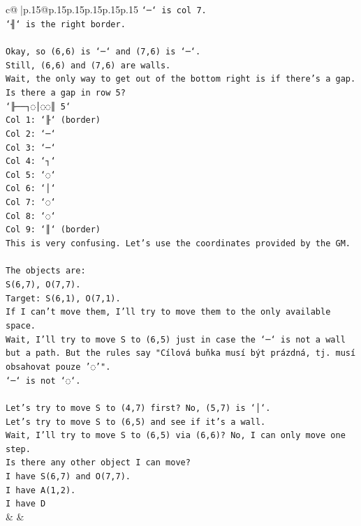 \documentclass{article}
\begin{document}
{\begin{supertabular}{c@{$\;$}|p{.15\linewidth}@{}p{.15\linewidth}p{.15\linewidth}p{.15\linewidth}p{.15\linewidth}p{.15\linewidth}}
{{{\texttt{`─` is col 7.} \\
\texttt{`╢` is the right border.} \\
\\ 
\texttt{Okay, so (6,6) is `─` and (7,6) is `─`.} \\
\texttt{Still, (6,6) and (7,6) are walls.} \\
\texttt{Wait, the only way to get out of the bottom right is if there's a gap.} \\
\texttt{Is there a gap in row 5?} \\
\texttt{`╟──┐◌│◌◌║ 5`} \\
\texttt{Col 1: `╟` (border)} \\
\texttt{Col 2: `─`} \\
\texttt{Col 3: `─`} \\
\texttt{Col 4: `┐`} \\
\texttt{Col 5: `◌`} \\
\texttt{Col 6: `│`} \\
\texttt{Col 7: `◌`} \\
\texttt{Col 8: `◌`} \\
\texttt{Col 9: `║` (border)} \\
\texttt{This is very confusing. Let's use the coordinates provided by the GM.} \\
\\ 
\texttt{The objects are:} \\
\texttt{S(6,7), O(7,7).} \\
\texttt{Target: S(6,1), O(7,1).} \\
\texttt{If I can't move them, I'll try to move them to the only available space.} \\
\texttt{Wait, I'll try to move S to (6,5) just in case the `─` is not a wall but a path. But the rules say "Cílová buňka musí být prázdná, tj. musí obsahovat pouze '◌'".} \\
\texttt{`─` is not `◌`.} \\
\\ 
\texttt{Let's try to move S to (4,7) first? No, (5,7) is `│`.} \\
\texttt{Let's try to move S to (6,5) and see if it's a wall.} \\
\texttt{Wait, I'll try to move S to (6,5) via (6,6)? No, I can only move one step.} \\
\texttt{Is there any other object I can move?} \\
\texttt{I have S(6,7) and O(7,7).} \\
\texttt{I have A(1,2).} \\
\texttt{I have D} \\
            }
        }
    }
    & & \\ \\


\end{supertabular}}
\end{document}
